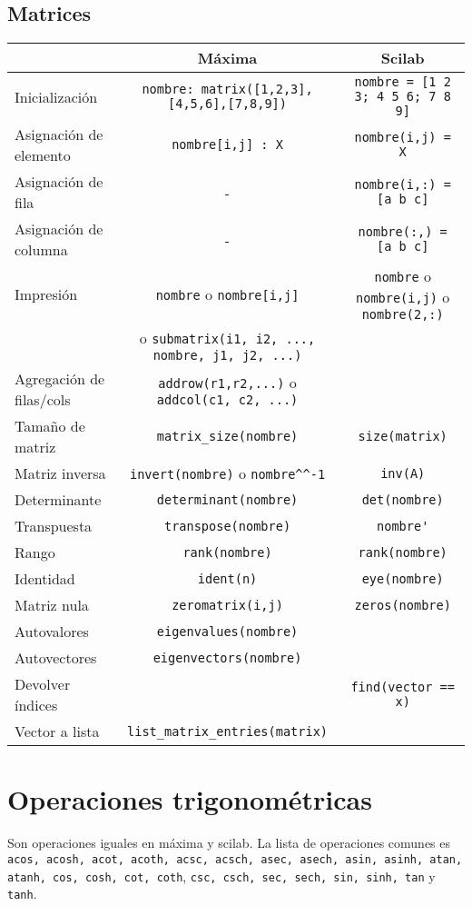 \documentclass[a4paper]{article}
\begin{document}
\subsection{Matrices}
\centering
\begin{tabular}{lcc}
	& Máxima & Scilab \\ \midrule
	Inicialización &\verb|nombre: matrix([1,2,3],[4,5,6],[7,8,9])|  & 	\verb|nombre = [1 2 3; 4 5 6; 7 8 9]| \\
	Asignación de elemento & \verb|nombre[i,j] : X|  & 	\verb|nombre(i,j) = X| \\
	Asignación de fila & - & 	\verb|nombre(i,:) = [a b c]| \\
	Asignación de columna & - & 	\verb|nombre(:,) = [a b c]| \\
	Impresión & \verb|nombre| o \verb|nombre[i,j]| 
	 & \verb|nombre| o \verb|nombre(i,j)| o \verb|nombre(2,:)| \\
	 & 				o \verb|submatrix(i1, i2, ..., nombre, j1, j2, ...)| & \\
	Agregación de filas/cols & \verb|addrow(r1,r2,...)| o \verb|addcol(c1, c2, ...)| & \\
	Tamaño de matriz & \verb|matrix_size(nombre)| & \verb|size(matrix)|\\
	Matriz inversa & \verb|invert(nombre)| o  \verb|nombre^^-1| & \verb|inv(A)| \\
	Determinante & \verb|determinant(nombre)| & \verb|det(nombre)| \\
	Transpuesta & \verb|transpose(nombre)| & \verb|nombre'| \\
	Rango & \verb|rank(nombre)| & \verb|rank(nombre)|\\
	Identidad & \verb|ident(n)| &\verb|eye(nombre)| \\
	Matriz nula & \verb|zeromatrix(i,j)| & \verb|zeros(nombre)|\\
	Autovalores & \verb|eigenvalues(nombre)| &  \\
	Autovectores & \verb|eigenvectors(nombre)| &  \\
	Devolver índices & & \verb!find(vector == x)! \\
	Vector a lista & \verb|list_matrix_entries(matrix)| & \\
\end{tabular}

\raggedright
\section{Operaciones trigonométricas}
Son operaciones iguales en máxima y scilab. La lista de operaciones comunes es \verb|acos, acosh, acot, acoth, acsc, acsch, asec, asech, asin, asinh, atan, atanh, cos, cosh, cot, coth|, \verb|csc, csch, sec, sech, sin, sinh, tan| y \verb|tanh|.
\end{document}
